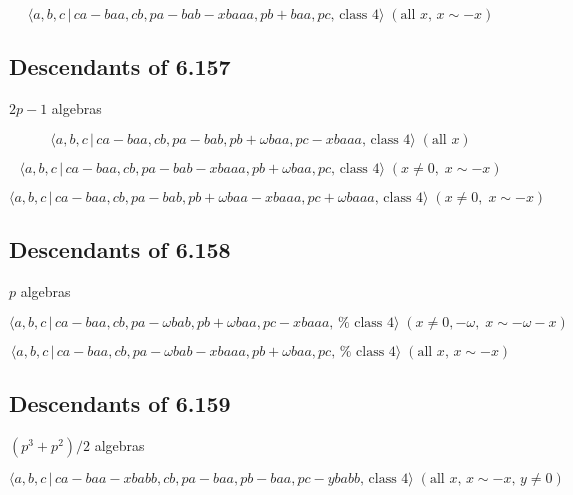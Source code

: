 \documentclass[10pt]{article}
\begin{document}
\begin{equation}
\langle a,b,c\,|\,ca-baa,cb,pa-bab-xbaaa,pb+baa,pc,\,\text{class }4\rangle
\;(\text{all }x,\,x\sim -x)  \tag{7.1745}
\end{equation}

\subsection{Descendants of 6.157}

$2p-1$ algebras

\begin{equation}
\langle a,b,c\,|\,ca-baa,cb,pa-bab,pb+\omega baa,pc-xbaaa,\,\text{class }%
4\rangle \;(\text{all }x)  \tag{7.1746}
\end{equation}

\begin{equation}
\langle a,b,c\,|\,ca-baa,cb,pa-bab-xbaaa,pb+\omega baa,pc,\,\text{class }%
4\rangle \;(x\neq 0,\;x\sim -x)  \tag{7.1747}
\end{equation}

\begin{equation}
\langle a,b,c\,|\,ca-baa,cb,pa-bab,pb+\omega baa-xbaaa,pc+\omega baaa,\,%
\text{class }4\rangle \;(x\neq 0,\;x\sim -x)  \tag{7.1748}
\end{equation}

\subsection{Descendants of 6.158}

$p$ algebras

\begin{equation}
\langle a,b,c\,|\,ca-baa,cb,pa-\omega bab,pb+\omega baa,pc-xbaaa,\,\text{%
class }4\rangle \;(x\neq 0,-\omega ,\;x\sim -\omega -x)  \tag{7.1749}
\end{equation}

\begin{equation}
\langle a,b,c\,|\,ca-baa,cb,pa-\omega bab-xbaaa,pb+\omega baa,pc,\,\text{%
class }4\rangle \;(\text{all }x,\,x\sim -x)  \tag{7.1750}
\end{equation}

\subsection{Descendants of 6.159}

$(p^{3}+p^{2})/2$ algebras

\begin{equation}
\langle a,b,c\,|\,ca-baa-xbabb,cb,pa-baa,pb-baa,pc-ybabb,\,\text{class }%
4\rangle \;(\text{all }x,\,x\sim -x,\,y\neq 0)  \tag{7.1751}
\end{equation}
\end{document}
